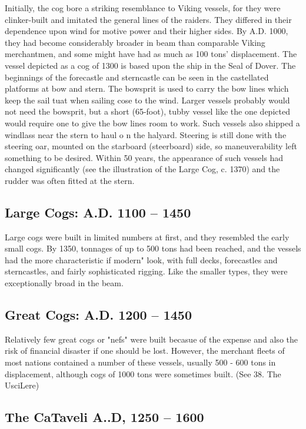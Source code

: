\documentclass{article}
\begin{document}
\begin{multicols}{3}
Initially, the cog bore a striking resemblance to Viking vessels, for
they were clinker-built and imitated the general lines of the raiders.
They differed in their dependence upon wind for motive power and their
higher sides.  By A.D. 1000, they had become considerably broader in
beam than comparable Viking merchantmen, and some might have had as
much as 100 tons' displacement.  The vessel depicted as a cog of 1300
is based upon the ship in the Seal of Dover.  The beginnings of the
forecastle and sterncastle can be seen in the castellated platforms at
bow and stern.  The bowsprit is used to carry the bow lines which keep
the sail tuat when sailing cose to the wind.  Larger vessels probably
would not need the bowsprit, but a short (65-foot), tubby vessel like
the one depicted would require one to give the bow lines room to work.
Such vessels also shipped a windlass near the stern to haul o n the
halyard.  Steering is still done with the steering oar, mounted on the
starboard (steerboard) side, so maneuverability left something to be
desired.  Within 50 years, the appearance of such vessels had changed
significantly (see the illustration of the Large Cog, c. 1370) and the
rudder was often fitted at the stern.

\subsection{Large Cogs:  A.D. 1100 -- 1450}

Large cogs were built in limited numbers at first, and they resembled
the early small cogs.  By 1350, tonnages of up to 500 tons had been
reached, and the vessels had the more characteristic if modern" look,
with full decks, forecastles and sterncastles, and fairly
sophisticated rigging.  Like the smaller types, they were
exceptionally broad in the beam.

\subsection{Great Cogs:  A.D. 1200 -- 1450}

Relatively few great cogs or "nefs" were built becasue of the expense
and also the risk of financial disaster if one should be lost.
However, the merchant fleets of most nations contained a number of
these vessels, usually 500 - 600 tons in displacement, although cogs
of 1000 tons were sometimes built.  (See 38.  The UsciLere)

\subsection{The CaTaveli  A..D, 1250 -- 1600}


\end{multicols}
\end{document}
